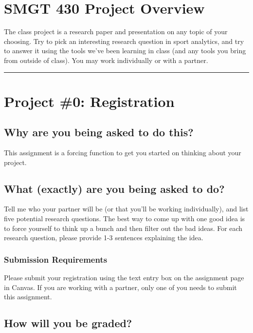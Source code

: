 \documentclass{article}
\begin{document}
  \section*{\sc SMGT 430 Project Overview}

    The class project is a research paper and presentation on any topic of your choosing. Try to pick an interesting research question in sport analytics, and try to answer it using the tools we've been learning in class (and any tools you bring from outside of class). You may work individually or with a partner.\\
  
  \hrule
  \section*{\sc Project \#0: Registration}

    \subsection*{\sc Why are you being asked to do this?}

      This assignment is a forcing function to get you started on thinking about your project.
    
    \subsection*{\sc What (exactly) are you being asked to do?}

    Tell me who your partner will be (or that you'll be working individually), and list five potential research questions. The best way to come up with one good idea is to force yourself to think up a bunch and then filter out the bad ideas. For each research question, please provide 1-3 sentences explaining the idea.

      \subsubsection*{\sc Submission Requirements}

        Please submit your registration using the text entry box on the assignment page in Canvas. If you are working with a partner, only one of you needs to submit this assignment.

    \subsection*{\sc How will you be graded?}
\end{document}
